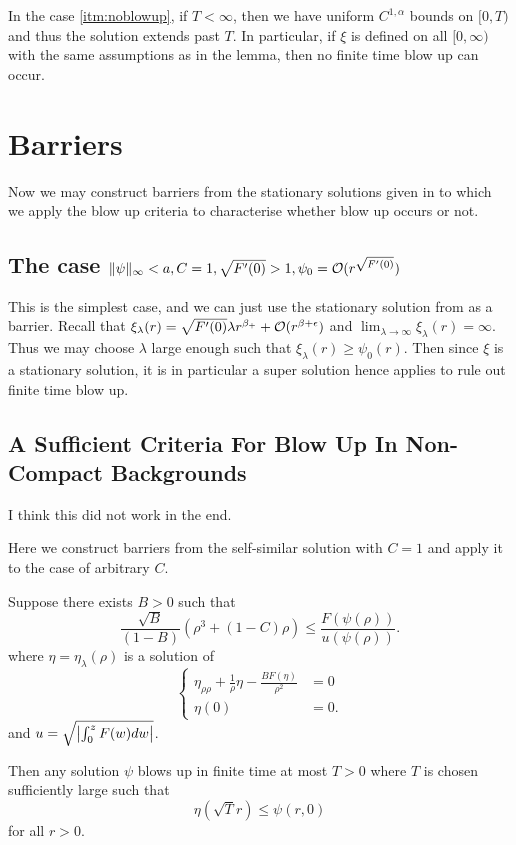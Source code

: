 \documentclass{amsart}
\begin{document}
\begin{rem}
In the case \ref{itm:noblowup}, if \(T < \infty\), then we have uniform \(C^{1,\alpha}\) bounds on \([0, T)\) and thus the solution extends past \(T\). In particular, if \(\xi\) is defined on all \([0, \infty)\) with the same assumptions as in the lemma, then no finite time blow up can occur.
\end{rem}

\section{Barriers}
\label{subsec:barriers}

Now we may construct barriers from the stationary solutions given in  to which we apply the blow up criteria  to characterise whether blow up occurs or not.

\subsection{The case \(\|\psi\|_{\infty} < a, C=1, \sqrt{F'(0)} > 1, \psi_0 = \operatorname{\mathcal{O}}(r^{\sqrt{F'(0)}})\)}

This is the simplest case, and we can just use the stationary solution from  as a barrier. Recall that \(\xi_{\lambda} (r) = \sqrt{F'(0)} \lambda r^{\beta_+} + \operatorname{\mathcal{O}}(r^{\beta + \epsilon})\) and \(\lim_{\lambda \to \infty} \xi_{\lambda} (r) = \infty\). Thus we may choose \(\lambda\) large enough such that \(\xi_{\lambda}(r) \geq \psi_0(r)\). Then since \(\xi\) is a stationary solution, it is in particular a super solution hence  applies to rule out finite time blow up. 

\subsection{A Sufficient Criteria For Blow Up In Non-Compact Backgrounds}

{\color{red} I think this did not work in the end.}

Here we construct barriers from the self-similar solution with \(C = 1\) and apply it to the case of arbitrary \(C\).

\begin{thm}
Suppose there exists \(B > 0\) such that
\[
\frac{\sqrt{B}}{(1-B)} \left(\rho^3 + (1-C)\rho\right) \leq \frac{F(\psi(\rho))}{u(\psi(\rho))}.
\]
where \(\eta = \eta_{\lambda}(\rho)\) is a solution of
\[
\begin{cases}
\eta_{\rho\rho} + \frac{1}{\rho} \eta - \frac{B F(\eta)}{\rho^2} &= 0 \\
\eta(0) &= 0.
\end{cases}
\]
and \(u = \sqrt{\left|{\int_0^z F(w) dw}\right|}\).

Then any solution \(\psi\) blows up in finite time at most \(T > 0\) where \(T\) is chosen sufficiently large such that
\[
\eta(\sqrt{T}r) \leq \psi(r, 0)
\]
for all \(r > 0\).
\end{thm}
\end{document}
